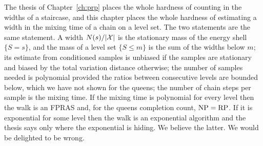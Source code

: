The thesis of Chapter~\ref{ch:prp} places the whole hardness of counting in the widths of a staircase, and this chapter places the whole hardness of estimating a width in the mixing time of a chain on a level set. The two statements are the same statement. A width $N(s) / |\mathcal{X}|$ is the stationary mass of the energy shell $\{ S = s \}$, and the mass of a level set $\{ S \le m \}$ is the sum of the widths below $m$; its estimate from conditioned samples is unbiased if the samples are stationary and biased by the total variation distance otherwise; the number of samples needed is polynomial provided the ratios between consecutive levels are bounded below, which we have not shown for the queens; the number of chain steps per sample is the mixing time. If the mixing time is polynomial for every level then the walk is an FPRAS and, for the queens completion count, $\mathrm{NP} = \mathrm{RP}$. If it is exponential for some level then the walk is an exponential algorithm and the thesis says only where the exponential is hiding. We believe the latter. We would be delighted to be wrong.
